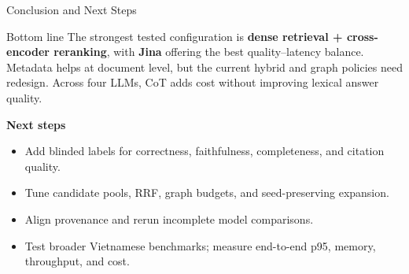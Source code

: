 \begin{frame}{Conclusion and Next Steps}
\scriptsize
\begin{block}{Bottom line}
The strongest tested configuration is \textbf{dense retrieval + cross-encoder reranking}, with \textbf{Jina} offering the best quality--latency balance. Metadata helps at document level, but the current hybrid and graph policies need redesign. Across four LLMs, CoT adds cost without improving lexical answer quality.
\end{block}
\vspace{0.2cm}
\textbf{Next steps}
\begin{itemize}
  \item Add blinded labels for correctness, faithfulness, completeness, and citation quality.
  \item Tune candidate pools, RRF, graph budgets, and seed-preserving expansion.
  \item Align provenance and rerun incomplete model comparisons.
  \item Test broader Vietnamese benchmarks; measure end-to-end p95, memory, throughput, and cost.
\end{itemize}
\vspace{0.15cm}
\centering
{}
\end{frame}
